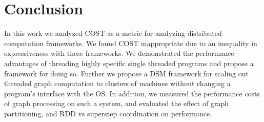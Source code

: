 \section{Conclusion}
\label{sec:conclusion}

In this work we analyzed COST as a metric for analyzing distributed
computation frameworks. We found COST inappropriate due to an inequality
in expressiveness with these frameworks. We demonstrated the
performance advantages of threading highly specific single threaded
programs and propose a framework for doing so. Further we propose a
DSM framework for scaling out threaded graph computation to clusters
of machines without changing a program's interface with the OS. In
addition, we measured the performance costs of graph processing on such
a system, and evaluated the effect of graph partitioning, and RDD vs
superstep coordination on performance.



